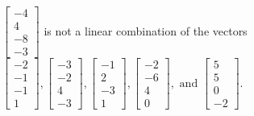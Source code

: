 \begin{exercise}
\begin{exerciseStatement}
  \end{exerciseStatement}
  \begin{exerciseAnswer}
   \(\left[\begin{array}{c}
-4 \\
4 \\
-8 \\
-3
\end{array}\right]\) 
  	 is not  
	a linear combination of the vectors \(\left[\begin{array}{c}
-2 \\
-1 \\
-1 \\
1
\end{array}\right] , \left[\begin{array}{c}
-3 \\
-2 \\
4 \\
-3
\end{array}\right] , \left[\begin{array}{c}
-1 \\
2 \\
-3 \\
1
\end{array}\right] , \left[\begin{array}{c}
-2 \\
-6 \\
4 \\
0
\end{array}\right] , \text{ and } \left[\begin{array}{c}
5 \\
5 \\
0 \\
-2
\end{array}\right]\).

	
  


  \end{exerciseAnswer}
\end{exercise}